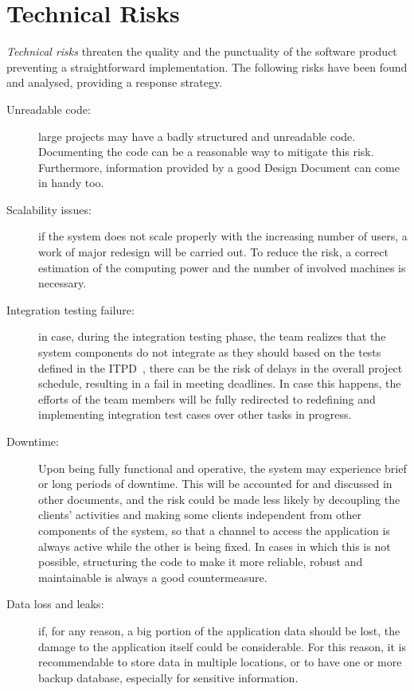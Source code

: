 
\section{Technical Risks}
\textit{Technical risks} threaten the quality and the punctuality of the software product preventing a straightforward implementation.
The following risks have been found and analysed, providing a response strategy. 
\begin{description}
\item[Unreadable code:] large projects may have a badly structured and unreadable code. Documenting the code can be a reasonable way to mitigate this risk. Furthermore, information provided by a good Design Document can come in handy too.
\item[Scalability issues:] if the system does not scale properly with the increasing number of users, a work of major redesign will be carried out. To reduce the risk, a correct estimation of the computing power and the number of involved machines is necessary.
\item[Integration testing failure:] in case, during the integration testing phase, the team realizes that the system components do not integrate as they should based on the tests defined in the ITPD~\cite{itpd}, there can be the risk of delays in the overall project schedule, resulting in a fail in meeting deadlines. In case this happens, the efforts of the team members will be fully redirected to redefining and implementing integration test cases over other tasks in progress.
\item[Downtime:] Upon being fully functional and operative, the system may experience brief or long periods of downtime. This will be accounted for and discussed in other documents, and the risk could be made less likely by decoupling the clients' activities and making some clients independent from other components of the system, so that a channel to access the application is always active while the other is being fixed. In cases in which this is not possible, structuring the code to make it more reliable, robust and maintainable is always a good countermeasure.
\item[Data loss and leaks:] if, for any reason, a big portion of the application data should be lost, the damage to the application itself could be considerable. For this reason, it is recommendable to store data in multiple locations, or to have one or more backup database, especially for sensitive information.
\end{description}

